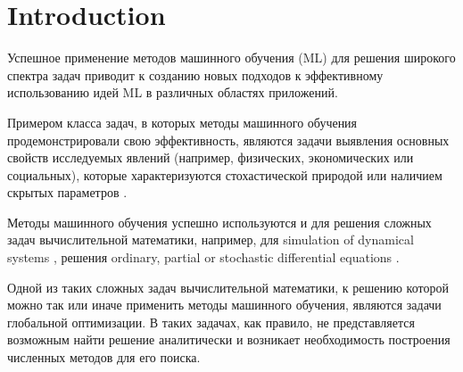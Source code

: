 \documentclass[entropy,article,submit,moreauthors,pdftex]{Definitions/mdpi}
\begin{document}

\section{Introduction}


Успешное применение методов машинного обучения (ML) для решения широкого спектра задач приводит к созданию новых подходов к эффективному использованию идей ML в различных областях приложений. 

Примером класса задач, в которых методы машинного обучения продемонстрировали свою эффективность, являются задачи выявления основных свойств исследуемых явлений (например, физических, экономических или социальных), которые характеризуются стохастической природой или наличием скрытых параметров \cite{Golovenkin2020,Gonoskov2019}.

Методы машинного обучения успешно используются и для решения сложных задач вычислительной математики, например, для simulation of dynamical systems \cite{Seleznev2019}, решения ordinary, partial or stochastic differential equations \cite{Lagaris1998,Blechschmidt2021,Xu2020} .

Одной из таких сложных задач вычислительной математики, к решению которой можно так или иначе применить методы машинного обучения, являются задачи глобальной оптимизации. 
В таких задачах, как правило, не представляется возможным найти решение аналитически и возникает необходимость построения численных методов для его поиска.
\end{document}
